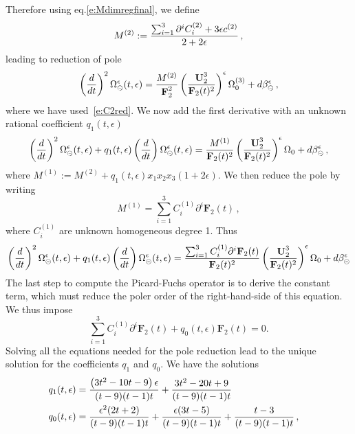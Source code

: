 \documentclass[a4paper,12pt]{article}
\numberwithin{equation}{section}
\numberwithin{figure}{section}
\def\su{\circleddash}
\begin{document}
%
Therefore using eq.\eqref{e:Mdimregfinal}, we define
\begin{equation}
  \label{e:M2}
  M^{(2)}:={\sum_{i=1}^3 \partial^i  C_i^{(2)}+3\epsilon
    c^{(2)}\over 2+2\epsilon} \,, 
\end{equation}
leading to reduction of pole
\begin{equation}
 \left(d\over dt\right)^2
  \Omega_{\su}^{\epsilon}(t,\epsilon)=
{M^{(2)}\over
     \textbf{F}_2^{2}}\left(\textbf{U}_2^3\over \textbf{F}_2(t)^2\right)^\epsilon \Omega_0^{(3)}+d\beta_\su^\epsilon \, ,
 \end{equation}
where we have used~\eqref{e:C2red}.
%
We now add the first derivative with an unknown rational coefficient $q_1(t,\epsilon)$
\begin{multline}
 \left(d\over dt\right)^2
  \Omega_{\su}^{\epsilon}(t,\epsilon) +q_1(t,\epsilon) \left(d\over dt\right)
  \Omega_{\su}^{\epsilon}(t,\epsilon) =
{M^{(1)}\over
     \textbf{F}_2(t)^{2}}\left(\textbf{U}_2^3\over \textbf{F}_2(t)^2\right)^\epsilon \Omega_0+d\beta_\su^\epsilon \, , 
 \end{multline}
where $M^{(1)}:=M^{(2)}+q_1(t,\epsilon) x_1x_2x_3(1+2\epsilon)$.
 We then reduce the pole by writing
 \begin{equation}\label{e:M2red}
   M^{(1)}= \sum_{i=1}^3
   C_i^{(1)} \partial^i \textbf{F}_2(t) \,, 
 \end{equation}
 where $ C_i^{(1)}$ are unknown homogeneous degree 1.
Thus
\begin{equation}
 \left(d\over dt\right)^2
  \Omega_{\su}^{\epsilon}(t,\epsilon) +q_1(t,\epsilon) \left(d\over dt\right)
  \Omega_{\su}^{\epsilon}(t,\epsilon) =
{ \sum_{i=1}^3
   C_i^{(1)} \partial^i \textbf{F}_2(t)\over
     \textbf{F}_2(t)^{2}}\left(\textbf{U}_2^3\over \textbf{F}_2(t)^2\right)^\epsilon \Omega_0+d\beta_\su^\epsilon
 \end{equation}
%
The last step to compute the Picard-Fuchs operator is to derive the constant term, which must reduce the poler order of the right-hand-side of this equation. We thus impose
\begin{equation}\label{e:c0}
  \sum_{i=1}^3C_i^{(1)}\partial^i \textbf{F}_2(t)+ q_0(t,\epsilon) \textbf{F}_2 (t) =0.
\end{equation}
%
Solving all the equations needed for the pole reduction lead
to the unique solution for the coefficients $q_1$ and $q_0$. 
We have the solutions
\begin{align}
  q_1(t,\epsilon)&=\frac{\left(3 t^2-10 t-9\right) \epsilon }{(t-9) (t-1) t}+\frac{3 t^2-20 t+9}{(t-9) (t-1)
   t}\cr
  q_0(t,\epsilon)&=\frac{\epsilon ^2 (2 t+2)}{(t-9) (t-1) t}+\frac{\epsilon  (3 t-5)}{(t-9) (t-1)
   t}+\frac{t-3}{(t-9) (t-1) t} \, ,
\end{align}
\end{document}
